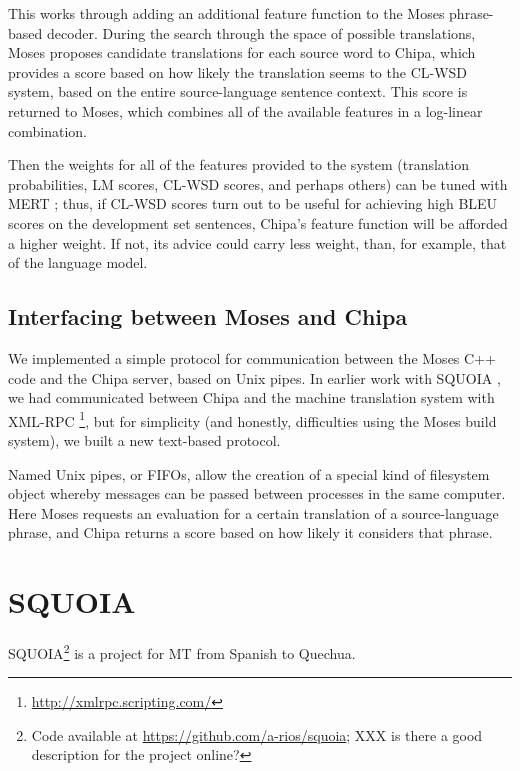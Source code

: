 This works through adding an additional feature function to the Moses
phrase-based decoder. During the search through the space of possible
translations, Moses proposes candidate translations for each source word to
Chipa, which provides a score based on how likely the translation seems to the
CL-WSD system, based on the entire source-language sentence context. This score
is returned to Moses, which combines all of the available features in a
log-linear combination.

Then the weights for all of the features provided to the system (translation
probabilities, LM scores, CL-WSD scores, and perhaps others) can be tuned with
MERT \cite{och:2003:ACL}; thus, if CL-WSD scores turn out to be useful for
achieving high BLEU scores on the development set sentences, Chipa's feature
function will be afforded a higher weight. If not, its advice could carry less
weight, than, for example, that of the language model.


\subsection{Interfacing between Moses and Chipa}
We implemented a simple protocol for communication between the Moses C++ code
and the Chipa server, based on Unix pipes. In earlier work with SQUOIA
\cite{rudnick:saltmil2014}, we had communicated between Chipa and the machine
translation system with XML-RPC \footnote{\url{http://xmlrpc.scripting.com/}},
but for simplicity (and honestly, difficulties using the Moses build system),
we built a new text-based protocol.

Named Unix pipes, or FIFOs, allow the creation of a special kind of filesystem
object whereby messages can be passed between processes in the same computer.
Here Moses requests an evaluation for a certain translation of a
source-language phrase, and Chipa returns a score based on how likely it
considers that phrase.

\section{SQUOIA}
SQUOIA\footnote{Code available at \url{https://github.com/a-rios/squoia};
XXX is there a good description for the project online?}
is a project for MT from Spanish to Quechua.


